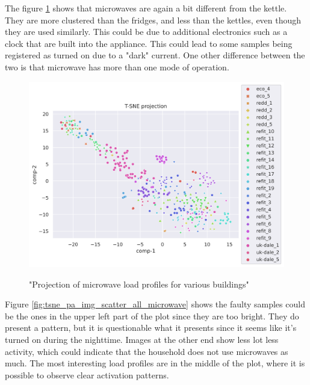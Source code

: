The figure \ref{fig:tsne_pa_scatter_all_microwave} shows that microwaves are again a bit different from the kettle.
They are more clustered than the fridges, and less than the kettles, even though they are used similarly.
This could be due to additional electronics such as a clock that are built into
the appliance. This could lead to some samples being registered as turned on due to 
a "dark" current. One other difference between the two is that microwave has more than one mode of operation.

\begin{figure}[H]
	\centering
	\caption{"Projection of microwave load profiles for various buildings"}
	\includegraphics[width=1.2\textwidth]{Figures/TSNE/TSNE_per_appliance/all/scatter_all_microwave.png}
	\label{fig:tsne_pa_scatter_all_microwave}
\end{figure}

Figure \ref{fig:tsne_pa_img_scatter_all_microwave} shows the faulty samples could be the ones in the upper left part of the plot since they are too bright.
They do present a pattern, but it is questionable what it presents since it seems like it's turned on during the nighttime. 
Images at the other end show less lot less activity, which could indicate that
the household does not use microwaves as much. The most interesting load profiles are in the middle of the 
plot, where it is possible to observe clear activation patterns. 

